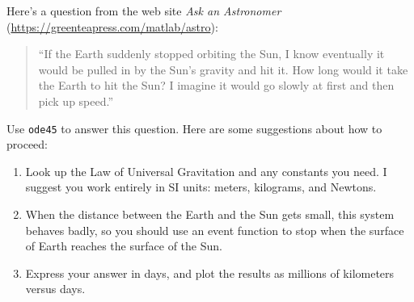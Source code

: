 \begin{ex}
\label{earth}


Here's a question from the web site {\em Ask an Astronomer} (\url{https://greenteapress.com/matlab/astro}):

\begin{quote}
``If the Earth suddenly stopped orbiting the Sun, I know eventually it would be pulled in by the Sun's gravity and hit it. How long would it take the Earth to hit the Sun? I imagine it would go slowly at first and then pick up speed.''
\end{quote}

Use {\tt ode45} to answer this question.  Here are some suggestions about how to proceed:

\begin{enumerate}

\item Look up the Law of Universal Gravitation and any constants you need. I suggest you work entirely in SI units: meters, kilograms, and Newtons.

\item When the distance between the Earth and the Sun gets small, this system behaves badly, so you should use an event function to stop when the surface of Earth reaches the surface of the Sun.

\item Express your answer in days, and plot the results as millions of kilometers versus days.

\end{enumerate}

\end{ex}


